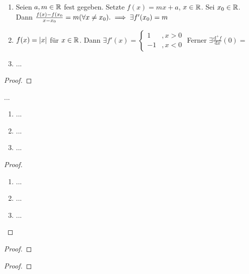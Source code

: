 \documentclass[12pt]{scrreprt}
\begin{document}
\begin{bsp}\label{}
\begin{enumerate}
\item Seien $a, m \in \mathbb{R}$ fest gegeben. Setzte $f(x) = mx +a$, $x\in\mathbb{R}$. Sei $x_0 \in \mathbb{R}$.
Dann $\frac{f(x)-f(x_0}{x-x_0} = m(\forall{x}\ne x_0). \implies \exists f'(x_0)=m$
\item $f(x) = \left\lvert x\right\lvert$ für $x\in \mathbb{R}$. Dann $\exists f'(x)=\begin{cases}
1 &, x > 0 \\ -1 &, x < 0
\end{cases} $ Ferner $\exists \frac{\mathrm{d}^+f}{\mathrm{d}x}(0)= $

\item ...
\end{enumerate}
\end{bsp}

\begin{satz}\label{}

\end{satz}
\begin{proof}

\end{proof}

\begin{satz}\label{}
...
\begin{enumerate}
\item ...
\item ...
\item ...
\end{enumerate}
\end{satz}
\begin{proof}
\begin{enumerate}
\item ...
\item ...
\item ...
\end{enumerate}
\end{proof}

\begin{kor}\label{}

\end{kor}

\begin{satz}\label{}

\end{satz}
\begin{proof}

\end{proof}

\begin{satz}\label{}

\end{satz}
\begin{bem*}

\end{bem*}
\begin{proof}

\end{proof}
\end{document}
